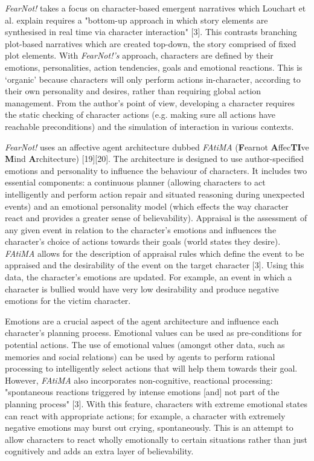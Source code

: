 \documentclass{sig-alternate-05-2015}
\begin{document}
\textit{FearNot!} takes a focus on character-based emergent narratives which Louchart et al. explain requires a "bottom-up approach in which story elements are synthesised in real time via character interaction" [3]. This contrasts branching plot-based narratives which are created top-down, the story comprised of fixed plot elements. With \textit{FearNot!'s} approach, characters are defined by their emotions, personalities, action tendencies, goals and emotional reactions. This is `organic' because characters will only perform actions in-character, according to their own personality and desires, rather than requiring global action management. From the author's point of view, developing a character requires the static checking of character actions (e.g. making sure all actions have reachable preconditions) and the simulation of interaction in various contexts.

\textit{FearNot!} uses an affective agent architecture dubbed \textit{FAtiMA} (\textbf{F}earnot \textbf{A}ffec\textbf{TI}ve \textbf{M}ind \textbf{A}rchitecture) [19][20]. The architecture is designed to use author-specified emotions and personality to influence the behaviour of characters. It includes two essential components: a continuous planner (allowing characters to act intelligently and perform action repair and situated reasoning during unexpected events) and an emotional personality model (which effects the way character react and provides a greater sense of believability). Appraisal is the assessment of any given event in relation to the character's emotions and influences the character's choice of actions towards their goals (world states they desire). \textit{FAtiMA} allows for the description of appraisal rules which define the event to be appraised and the desirability of the event on the target character [3]. Using this data, the character's emotions are updated. For example, an event in which a character is bullied would have very low desirability and produce negative emotions for the victim character.

Emotions are a crucial aspect of the agent architecture and influence each character's planning process. Emotional values can be used as pre-conditions for potential actions. The use of emotional values (amongst other data, such as memories and social relations) can be used by agents to perform rational processing to intelligently select actions that will help them towards their goal. However, \textit{FAtiMA} also incorporates non-cognitive, reactional processing: "spontaneous reactions triggered by intense emotions [and] not part of the planning process" [3]. With this feature, characters with extreme emotional states can react with appropriate actions; for example, a character with extremely negative emotions may burst out crying, spontaneously. This is an attempt to allow characters to react wholly emotionally to certain situations rather than just cognitively and adds an extra layer of believability.
\end{document}
